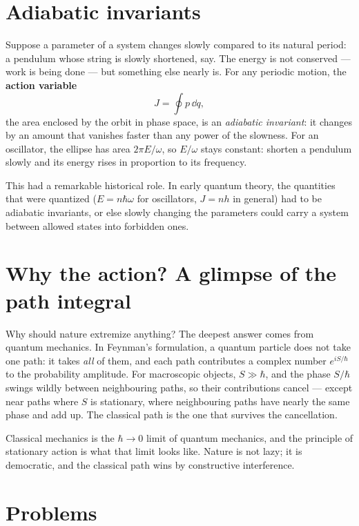 \section{Adiabatic invariants}

Suppose a parameter of a system changes slowly compared to its natural period: a pendulum whose string is slowly shortened, say. The energy is not conserved --- work is being done --- but something else nearly is. For any periodic motion, the \textbf{action variable}
\[
  J = \oint p\,\dd q,
\]
the area enclosed by the orbit in phase space, is an \emph{adiabatic invariant}: it changes by an amount that vanishes faster than any power of the slowness. For an oscillator, the ellipse has area $2\pi E/\omega$, so $E/\omega$ stays constant: shorten a pendulum slowly and its energy rises in proportion to its frequency.

This had a remarkable historical role. In early quantum theory, the quantities that were quantized ($E = n\hbar\omega$ for oscillators, $J = nh$ in general) had to be adiabatic invariants, or else slowly changing the parameters could carry a system between allowed states into forbidden ones.

\section{Why the action? A glimpse of the path integral}

Why should nature extremize anything? The deepest answer comes from quantum mechanics. In Feynman's formulation, a quantum particle does not take one path: it takes \emph{all} of them, and each path contributes a complex number $e^{iS/\hbar}$ to the probability amplitude. For macroscopic objects, $S\gg\hbar$, and the phase $S/\hbar$ swings wildly between neighbouring paths, so their contributions cancel --- except near paths where $S$ is stationary, where neighbouring paths have nearly the same phase and add up. The classical path is the one that survives the cancellation.

\begin{keyidea}
Classical mechanics is the $\hbar\to0$ limit of quantum mechanics, and the principle of stationary action is what that limit looks like. Nature is not lazy; it is democratic, and the classical path wins by constructive interference.
\end{keyidea}

\section{Problems}

